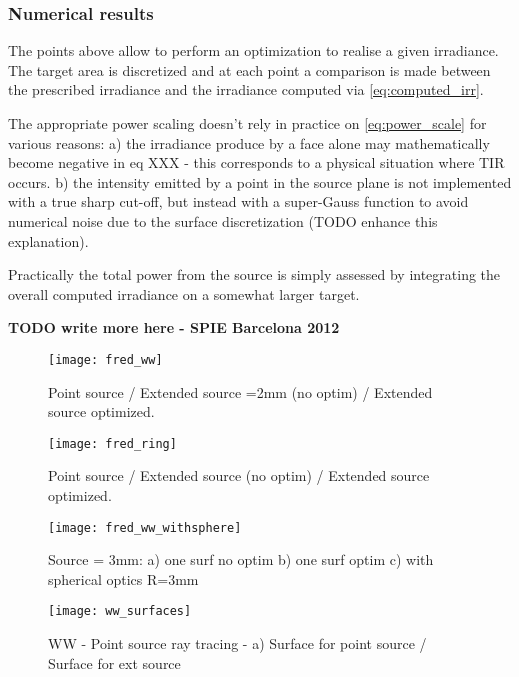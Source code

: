 \subsubsection*{Numerical results}
The points above allow to perform an optimization to realise a given irradiance.
The target area is discretized and at each point a comparison is made between 
the prescribed irradiance and the irradiance computed via \eqref{eq:computed_irr}.

The appropriate power scaling doesn't rely in practice on \eqref{eq:power_scale}
for various reasons: a) the irradiance produce by a face alone may mathematically
become negative in eq XXX - this corresponds to a physical situation where
TIR occurs. 
b) the intensity emitted by a point in the source plane is not implemented with
a true sharp cut-off, but instead with a super-Gauss function to avoid numerical
noise due to the surface discretization (TODO enhance this explanation).

Practically the total power from the source is simply assessed by integrating the overall
computed irradiance on a somewhat larger target.

\textbf{TODO write more here - SPIE Barcelona 2012}

\begin{figure}[!htbp]
\centering
\texttt{[image: fred\_ww]} 
\caption{Point source / Extended source =2mm (no optim) / Extended source optimized. }
\label{fig:res_fred_ww}
\end{figure}

\begin{figure}[!htbp]
\centering
\texttt{[image: fred\_ring]} 
\caption{Point source / Extended source (no optim) / Extended source optimized. }
\label{fig:res_fred_ring}
\end{figure}

\begin{figure}[!htbp]
\centering
\texttt{[image: fred\_ww\_withsphere]} 
\caption{ Source = 3mm: a) one surf no optim b) one surf optim c) with spherical optics R=3mm}
\label{fig:res_fred_ww_sphere}
\end{figure}

\begin{figure}[!htbp]
\centering
\texttt{[image: ww\_surfaces]} 
\caption{WW - Point source ray tracing - a) Surface for point source / Surface for ext source}
\label{fig:res_ww_surfaces}
\end{figure}

